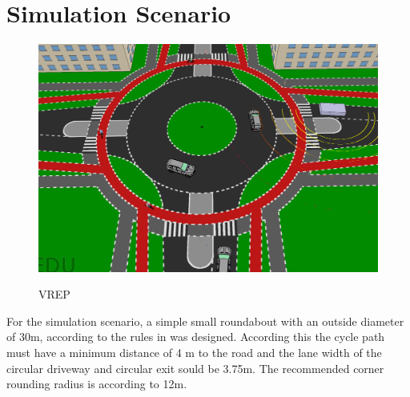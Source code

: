 \documentclass[11pt,oneside,openright]{mpreport}
\begin{document}
\section{Simulation Scenario}


\begin{figure}[!ht]
\caption{VREP}
\includegraphics[width=\textwidth]{bilder/scenario.png}
\label{vrep}
\end{figure}





For the simulation scenario, a simple small roundabout with an outside diameter of 30m, according to the rules in \cite{man06} was designed. According this the cycle path must have a minimum distance of 4 m to the road and
the lane width of the circular driveway and circular exit sould be 3.75m. The recommended corner rounding radius is according to \cite{man06} 12m.
\end{document}
